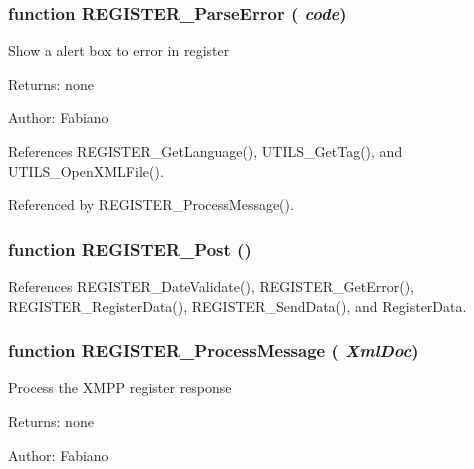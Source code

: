 \subsubsection{\setlength{\rightskip}{0pt plus 5cm}function REGISTER\_\-ParseError ( {\em code})}\label{register_8js_a9961667728099b1c4c97a1c5ee778be}


Show a alert box to error in register

\begin{Desc}
\item[Returns:]none \end{Desc}
\begin{Desc}
\item[Author:]Fabiano \end{Desc}


References REGISTER\_\-GetLanguage(), UTILS\_\-GetTag(), and UTILS\_\-OpenXMLFile().

Referenced by REGISTER\_\-ProcessMessage().
\subsubsection{\setlength{\rightskip}{0pt plus 5cm}function REGISTER\_\-Post ()}\label{register_8js_8d73a5840a1e6955fc6b61e824d60709}




References REGISTER\_\-DateValidate(), REGISTER\_\-GetError(), REGISTER\_\-RegisterData(), REGISTER\_\-SendData(), and RegisterData.
\subsubsection{\setlength{\rightskip}{0pt plus 5cm}function REGISTER\_\-ProcessMessage ( {\em XmlDoc})}\label{register_8js_071c2098a32807d7c980d9b42d35f2c8}


Process the XMPP register response

\begin{Desc}
\item[Returns:]none \end{Desc}
\begin{Desc}
\item[Author:]Fabiano \end{Desc}


